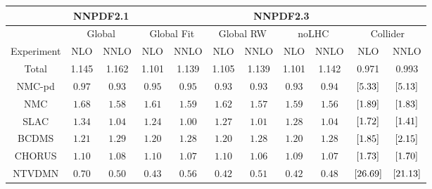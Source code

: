 \scriptsize
\begin{tabular}{c||c|c||c|c||c|c||c|c||c|c}
\hline 
& \multicolumn{2}{c||}{\bf NNPDF2.1} & \multicolumn{8}{|c}{\bf NNPDF2.3}  \\
\hline 
&  \multicolumn{2}{c||}{Global} &  \multicolumn{2}{|c||}{Global Fit} &
 \multicolumn{2}{|c||}{Global RW} &  \multicolumn{2}{|c||}{noLHC} &
 \multicolumn{2}{|c}{Collider}   \\
\hline 
\hline 
Experiment  & NLO & NNLO  & NLO  & NNLO  & NLO  & NNLO  & NLO  & NNLO  &
NLO  & NNLO   \\
\hline 

Total  &   1.145&   1.162 &    1.101 &    1.139 &    1.105 &    1.139 &    1.101 &    1.142 &    0.971 &    0.993 \\  
 \hline 
NMC-pd              & $          0.97      $ & $          0.93      $  &  $          0.95      $  &  $          0.95      $  &  $         0.93      $ &  $         0.93      $ &  $          0.93      $  &  $          0.94      $  &  $  \left[     5.33 \right]  $  &  $  \left[     5.13 \right]  $  \\  
NMC                 & $          1.68      $ & $          1.58      $  &  $          1.61      $  &  $          1.59      $  &  $         1.62      $ &  $         1.57      $ &  $          1.59      $  &  $          1.56      $  &  $  \left[     1.89 \right]  $  &  $  \left[     1.83 \right]  $  \\  
SLAC                & $          1.34      $ & $          1.04      $  &  $          1.24      $  &  $          1.00      $  &  $         1.27      $ &  $         1.01      $ &  $          1.28      $  &  $          1.04      $  &  $  \left[     1.72 \right]  $  &  $  \left[     1.41 \right]  $  \\  
BCDMS               & $          1.21      $ & $          1.29      $  &  $          1.20      $  &  $          1.28      $  &  $         1.20      $ &  $         1.28      $ &  $          1.20      $  &  $          1.28      $  &  $  \left[     1.85 \right]  $  &  $  \left[     2.15 \right]  $  \\  
CHORUS              & $          1.10      $ & $          1.08      $  &  $          1.10      $  &  $          1.07      $  &  $         1.10      $ &  $         1.06      $ &  $          1.09      $  &  $          1.07      $  &  $  \left[     1.73 \right]  $  &  $  \left[     1.70 \right]  $  \\  
NTVDMN              & $          0.70      $ & $          0.50      $  &  $          0.43      $  &  $          0.56      $  &  $         0.42      $ &  $         0.51      $ &  $          0.42      $  &  $          0.48      $  &  $  \left[    26.69 \right]  $  &  $  \left[    21.13 \right]  $  \\  

\end{tabular}
